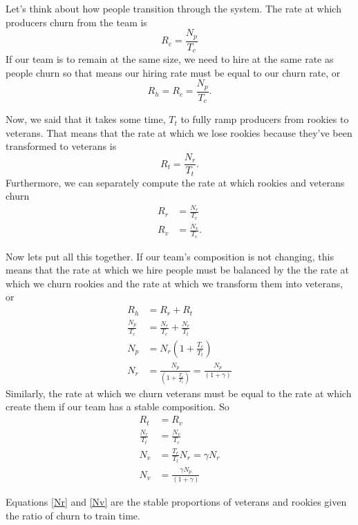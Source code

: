 \documentclass[paper=a4, fontsize=11pt abstract]{scrartcl}
\numberwithin{equation}{section}		%
\numberwithin{figure}{section}			%
\numberwithin{table}{section}				%
\begin{document}
Let's think about how people transition through the system.  The rate at which producers churn from the team is
\begin{equation}
    R_c = \frac{N_p}{T_c}
\end{equation}
If our team is to remain at the same size, we need to hire at the same rate as people churn so that means our hiring rate must be equal to our churn rate, or
\begin{equation}
    R_h = R_c = \frac{N_p}{T_c}.
\end{equation}

Now, we said that it takes some time, $T_t$ to fully ramp producers from rookies to veterans.  That means that the rate at which we lose rookies because they've been transformed to veterans is
\begin{equation}
    R_t = \frac{N_r}{T_t}.
\end{equation}
Furthermore, we can separately compute the rate at which rookies and veterans churn
\begin{align}
    R_r &= \frac{N_r}{T_c} \\
    R_v &= \frac{N_v}{T_c}.
\end{align}

Now lets put all this together.  If our team's composition is not changing, this means that the rate at which we hire people must be balanced by the the rate at which we churn rookies and the rate at which we transform them into veterans, or
\begin{align}
    R_h &= R_r + R_t \\
    \frac{N_p}{T_c} &= \frac{N_r}{T_c} + \frac{N_r}{T_t} \\
    N_p &= N_r\left(1 + \frac{T_c}{T_t}\right) \\
    N_r &= \frac{N_p}{\left(1 + \frac{T_c}{T_t}\right)} = \frac{N_p}{\left(1 + \gamma\right)} \label{Nr}
\end{align}
Similarly, the rate at which we churn veterans must be equal to the rate at which create them if our team has a stable composition.  So
\begin{align}
    R_t &= R_v \\
    \frac{N_r}{T_t} &= \frac{N_v}{T_c} \\
    N_v &= \frac{T_c}{T_t}N_r = \gamma N_r \\
    N_v &= \frac{\gamma N_p}{\left(1 + \gamma\right)} \label{Nv}
\end{align}

Equations \ref{Nr} and \ref{Nv} are the stable proportions of veterans and rookies given the ratio of churn to train time.
\end{document}
